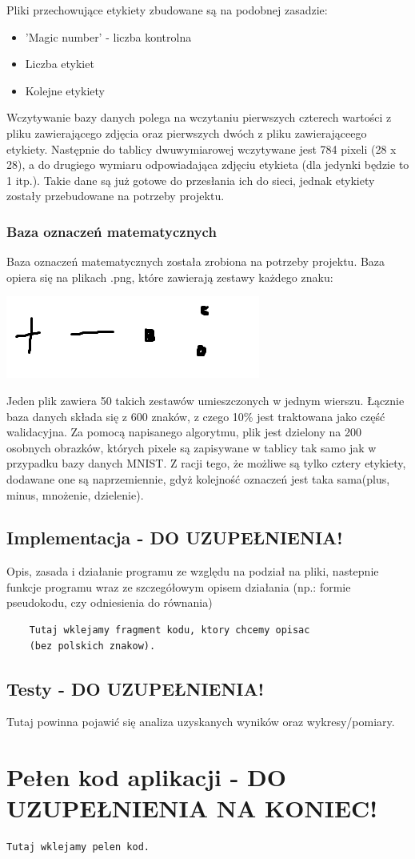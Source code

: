 \documentclass[12pt,a4paper]{article}
\begin{document}
	Pliki przechowujące etykiety zbudowane są na podobnej zasadzie:
	\begin{itemize}
	\item 'Magic number' - liczba kontrolna
	\item Liczba etykiet
	\item Kolejne etykiety
	\end{itemize}
	
	Wczytywanie bazy danych polega na wczytaniu pierwszych czterech wartości z pliku zawierającego zdjęcia oraz pierwszych dwóch z pliku zawierająceego etykiety. Następnie do tablicy dwuwymiarowej wczytywane jest 784 pixeli (28 x 28), a do drugiego wymiaru odpowiadająca zdjęciu etykieta (dla jedynki będzie to 1 itp.). Takie dane są już gotowe do przesłania ich do sieci, jednak etykiety zostały przebudowane na potrzeby projektu.
	
	\subsubsection*{Baza oznaczeń matematycznych}
	Baza oznaczeń matematycznych została zrobiona na potrzeby projektu. Baza opiera się na plikach .png, które zawierają zestawy każdego znaku:
	\begin{center}
	\includegraphics[scale=1]{dane1.png} 
	\end{center}	 
	Jeden plik zawiera 50 takich zestawów umieszczonych w jednym wierszu. Łącznie baza danych składa się z 600 znaków, z czego 10\%  jest traktowana jako część walidacyjna. Za pomocą napisanego algorytmu, plik jest dzielony na 200 osobnych obrazków, których pixele są zapisywane w tablicy tak samo jak w przypadku bazy danych MNIST. Z racji tego, że możliwe są tylko cztery etykiety, dodawane one są naprzemiennie, gdyż kolejność oznaczeń jest taka sama(plus, minus, mnożenie, dzielenie). 
	\subsection*{Implementacja - \textbf{DO UZUPEŁNIENIA!}}
	Opis, zasada i działanie programu ze względu na podział na pliki, nastepnie	funkcje programu wraz ze szczegółowym opisem działania (np.: formie pseudokodu, czy odniesienia do równania)
	\begin{lstlisting}
	Tutaj wklejamy fragment kodu, ktory chcemy opisac 
	(bez polskich znakow).
	\end{lstlisting}
	\subsection*{Testy - \textbf{DO UZUPEŁNIENIA!}}
	Tutaj powinna pojawić się analiza uzyskanych wyników oraz wykresy/pomiary.
	\newpage
	\section*{Pełen kod aplikacji - \textbf{DO UZUPEŁNIENIA NA KONIEC!}}
\begin{lstlisting}
Tutaj wklejamy pelen kod. 
\end{lstlisting}
\end{document}

